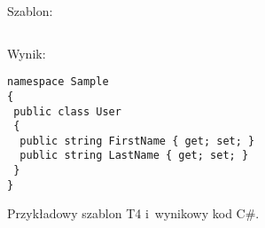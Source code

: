 \begin{figure}[!ht]
Szablon:

\begin{verbatim}

\end{verbatim}

Wynik:

\begin{verbatim}
namespace Sample
{
 public class User
 {
  public string FirstName { get; set; }
  public string LastName { get; set; }
 }
}
\end{verbatim}

\caption{Przykładowy szablon T4 i~wynikowy kod C\#.}
\label{fig:implementation_core:t4}
\end{figure}
